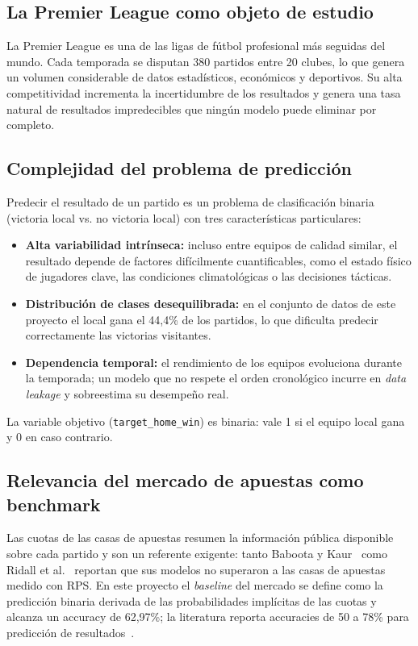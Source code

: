 \documentclass{ieeeaccess}
\begin{document}
\subsection{La Premier League como objeto de estudio}
La Premier League es una de las ligas de fútbol profesional más seguidas del mundo. Cada temporada se disputan 380 partidos entre 20 clubes, lo que genera un volumen considerable de datos estadísticos, económicos y deportivos. Su alta competitividad incrementa la incertidumbre de los resultados y genera una tasa natural de resultados impredecibles que ningún modelo puede eliminar por completo.

\subsection{Complejidad del problema de predicción}
Predecir el resultado de un partido es un problema de clasificación binaria (victoria local vs. no victoria local) con tres características particulares:
\begin{itemize}
\item \textbf{Alta variabilidad intrínseca:} incluso entre equipos de calidad similar, el resultado depende de factores difícilmente cuantificables, como el estado físico de jugadores clave, las condiciones climatológicas o las decisiones tácticas.
\item \textbf{Distribución de clases desequilibrada:} en el conjunto de datos de este proyecto el local gana el 44,4\% de los partidos, lo que dificulta predecir correctamente las victorias visitantes.
\item \textbf{Dependencia temporal:} el rendimiento de los equipos evoluciona durante la temporada; un modelo que no respete el orden cronológico incurre en \textit{data leakage} y sobreestima su desempeño real.
\end{itemize}
La variable objetivo (\texttt{target\_home\_win}) es binaria: vale 1 si el equipo local gana y 0 en caso contrario.

\subsection{Relevancia del mercado de apuestas como benchmark}
Las cuotas de las casas de apuestas resumen la información pública disponible sobre cada partido y son un referente exigente: tanto Baboota y Kaur~\cite{baboota2019predictive} como Ridall et al.~\cite{ridall2025bayesian} reportan que sus modelos no superaron a las casas de apuestas medido con RPS. En este proyecto el \textit{baseline} del mercado se define como la predicción binaria derivada de las probabilidades implícitas de las cuotas y alcanza un accuracy de 62,97\%; la literatura reporta accuracies de 50 a 78\% para predicción de resultados~\cite{ricogonzalez2023ml}.
\end{document}
